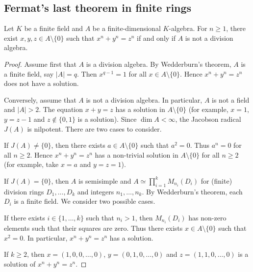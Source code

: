 \subsection{Fermat's last theorem in finite rings}

\begin{theorem}
    Let $K$ be a finite field and $A$ be a finite-dimensional $K$-algebra.
    For $n\geq1$, there exist $x,y,z\in A\setminus\{0\}$ 
    such that $x^n+y^n=z^n$ if and only if 
    $A$ is not a division algebra.
\end{theorem}

\begin{proof}
    Assume first that $A$ is a division algebra. By Wedderburn's theorem, 
    $A$ is a finite field, say $|A|=q$. Then $x^{q-1}=1$ for all $x\in A\setminus\{0\}$.
    Hence $x^n+y^n=z^n$ does not have a solution. 
    
    Conversely, assume that $A$ is not a division algebra. In particular, 
    $A$ is not a field and $|A|>2$. The equation $x+y=z$ has a solution in $A\setminus\{0\}$ (for example, $x=1$, $y=z-1$ and $z\not\in\{0,1\}$ is a solution). Since
    $\dim A<\infty$, the Jacobson radical $J(A)$ is nilpotent. There are two 
    cases to consider. 
    
    If $J(A)\ne\{0\}$, 
    then there exists $a\in A\setminus\{0\}$ such that $a^2=0$. Thus $a^n=0$ 
    for all $n\geq2$. Hence $x^n+y^n=z^n$ has a non-trivial
    solution in $A\setminus\{0\}$ for all $n\geq2$ (for example, take 
    $x=a$ and $y=z=1$).
    
    If $J(A)=\{0\}$, then $A$ is semisimple and 
    $A\simeq\prod_{i=1}^k M_{n_i}(D_i)$ for (finite) division rings $D_1,\dots,D_k$
    and integers $n_1,\dots,n_k$. By Wedderburn's theorem, each $D_i$ is a finite
    field. We consider two possible cases. 
    
    If there exists $i\in\{1,\dots,k\}$ such that $n_i>1$, then
    $M_{n_i}(D_i)$ has non-zero elements such that their squares are zero. Thus 
    there exists $x\in A\setminus\{0\}$ such that $x^2=0$. In particular, 
    $x^n+y^n=z^n$ has a solution. 
    
    If $k\geq 2$, then $x=(1,0,0,\dots,0)$, $y=(0,1,0,\dots,0)$ 
    and $z=(1,1,0,\dots,0)$ is a solution of $x^n+y^n=z^n$.
\end{proof}
